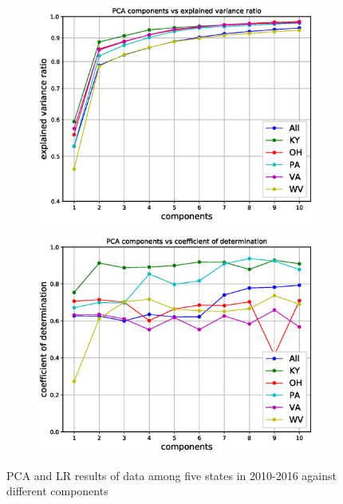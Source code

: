 \documentclass{mcmthesis}
\begin{document}
    \begin{figure}[H]
    \centering
    \begin{subfigure}[b]{0.49\textwidth}
        \includegraphics[width=\textwidth]{../figure/pca_state_ratio.eps}
        \label{fig:pca_state_ratio}
    \end{subfigure}
    \begin{subfigure}[b]{0.49\textwidth}
        \includegraphics[width=\textwidth]{../figure/pca_state_score.eps}
        \label{fig:pca_state_score}
    \end{subfigure}
    \caption{PCA and LR results of data among five states in 2010-2016 against different components}\label{fig:pca_state}
\end{figure}
\end{document}
